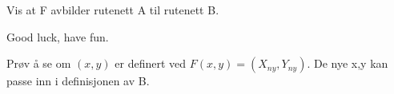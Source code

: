 Vis at F avbilder rutenett A til rutenett B.

Good luck, have fun.

Prøv å se om $(x,y)$ er definert ved $F(x,y) = (X_{ny}, Y_{ny})$.
De nye x,y kan passe inn i definisjonen av B.
